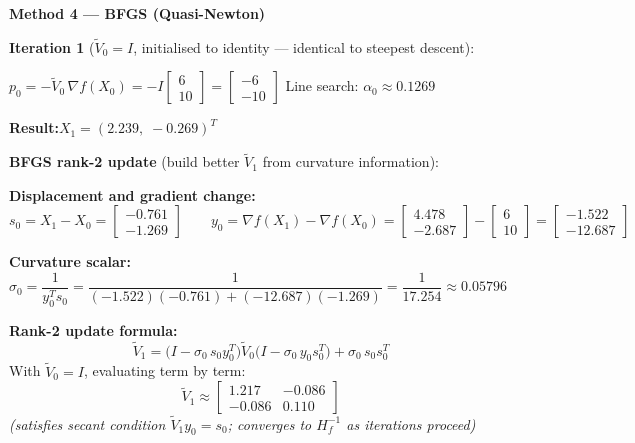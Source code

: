 \documentclass[11pt,a4paper]{article}
\newcommand{\sectionbox}[1]{%
  \begin{mdframed}[backgroundcolor=headbg, linewidth=0pt,
    innertopmargin=4pt, innerbottommargin=4pt,
    innerleftmargin=8pt, innerrightmargin=8pt]
    \large\bfseries\color{white}#1
  \end{mdframed}\vspace{4pt}
}
\newenvironment{methodbox}[1]{%
  \begin{mdframed}[backgroundcolor=#1, linewidth=0.5pt,
    innertopmargin=6pt, innerbottommargin=6pt,
    innerleftmargin=10pt, innerrightmargin=10pt]
}{%
  \end{mdframed}\vspace{4pt}
}
\begin{document}
\sectionbox{Method 4 --- BFGS (Quasi-Newton)}

\begin{methodbox}{sdbg}
\textbf{Iteration 1} ($\tilde{V}_0 = I$, initialised to identity --- identical to steepest descent):

\medskip
$\boxed{p_0 = -\tilde{V}_0\,\nabla f(X_0)} = -I\begin{bmatrix}6\\10\end{bmatrix} = \begin{bmatrix}-6\\-10\end{bmatrix}$
\quad Line search: $\alpha_0 \approx 0.1269$

\medskip
\textbf{Result:}\quad $X_1 = (2.239,\;-0.269)^T$

\bigskip
\textbf{BFGS rank-2 update} (build better $\tilde{V}_1$ from curvature information):

\medskip
\textbf{Displacement and gradient change:}
\[
  s_0 = X_1 - X_0 = \begin{bmatrix}-0.761\\-1.269\end{bmatrix}
  \qquad
  y_0 = \nabla f(X_1) - \nabla f(X_0)
      = \begin{bmatrix}4.478\\-2.687\end{bmatrix} - \begin{bmatrix}6\\10\end{bmatrix}
      = \begin{bmatrix}-1.522\\-12.687\end{bmatrix}
\]

\textbf{Curvature scalar:}\quad
$\sigma_0 = \dfrac{1}{y_0^T s_0} = \dfrac{1}{(-1.522)(-0.761)+(-12.687)(-1.269)} = \dfrac{1}{17.254} \approx 0.05796$

\medskip
\textbf{Rank-2 update formula:}
\[
  \boxed{\tilde{V}_1 = \bigl(I - \sigma_0\,s_0 y_0^T\bigr)\tilde{V}_0\bigl(I - \sigma_0\,y_0 s_0^T\bigr) + \sigma_0\,s_0 s_0^T}
\]
With $\tilde{V}_0 = I$, evaluating term by term:
\[
  \tilde{V}_1 \approx \begin{bmatrix}1.217 & -0.086\\-0.086 & 0.110\end{bmatrix}
\]
\textit{(satisfies secant condition $\tilde{V}_1 y_0 = s_0$; converges to $H_f^{-1}$ as iterations proceed)}


\end{methodbox}
\end{document}
